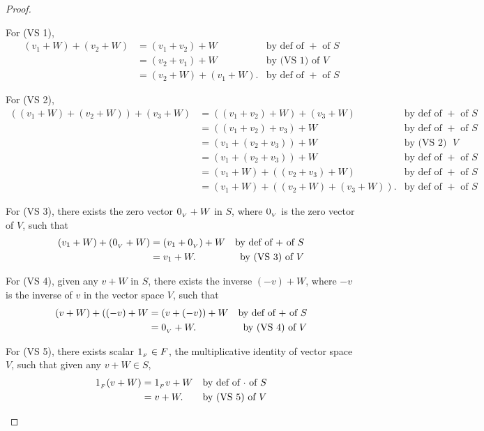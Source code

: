 \begin{proof}
\begin{enumerate}
For (VS 1),
\begin{align*}
    (v_1 + W) + (v_2 + W) & = (v_1 + v_2) + W & \text{by def of \(+\) of \(S\)} \\
                          & = (v_2 + v_1) + W & \text{by (VS 1) of \(V\)} \\
                          & = (v_2 + W) + (v_1 + W). & \text{by def of \(+\) of \(S\)}
\end{align*}

For (VS 2),
\begin{align*}
    ((v_1 + W) + (v_2 + W)) + (v_3 + W) & = ((v_1 + v_2) + W) + (v_3 + W) & \text{by def of \(+\) of \(S\)} \\
                          & = ((v_1 + v_2) + v_3) + W & \text{by def of \(+\) of \(S\)} \\
                          & = (v_1 + (v_2 + v_3)) + W & \text{by (VS 2) of \(V\)} \\
                          & = (v_1 + (v_2 + v_3)) + W & \text{by def of \(+\) of \(S\)} \\
                          & = (v_1 + W) + ((v_2 + v_3) + W) & \text{by def of \(+\) of \(S\)} \\
                          & = (v_1 + W) + ((v_2 + W) + (v_3 + W)). & \text{by def of \(+\) of \(S\)}
\end{align*}

For (VS 3), there exists the zero vector \(0_{_V} + W\) in \(S\), where \(0_{_V}\) is the zero vector of \(V\), such that
\begin{align*}
    (v_1 + W) + (0_{_V} + W) & = (v_1 + 0_{_V}) + W & \text{by def of \(+\) of \(S\)} \\
                          & = v_1 + W. & \text{by (VS 3) of \(V\)}
\end{align*}

For (VS 4), given any \(v + W\) in \(S\), there exists the inverse \((-v) + W\), where \(-v\) is the inverse of \(v\) in the vector space \(V\), such that
\begin{align*}
    (v + W) + ((-v) + W & = (v + (-v)) + W & \text{by def of \(+\) of \(S\)} \\
                        & = 0_{_V} + W. & \text{by (VS 4) of \(V\)}
\end{align*}

For (VS 5), there exists scalar \(1_{_F} \in F\), the multiplicative identity of vector space \(V\), such that given any \(v + W \in S\),
\begin{align*}
    1_{_F}(v + W)& = 1_{_F} v + W & \text{by def of \(\cdot\) of \(S\)} \\
                          & = v + W. & \text{by (VS 5) of \(V\)}
\end{align*}


\end{enumerate}
\end{proof}
